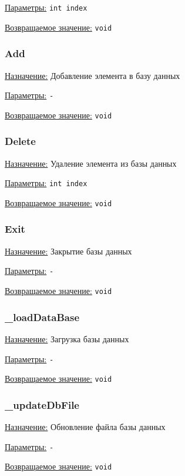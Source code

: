 \underline{Параметры:} \verb|int index|

\underline{Возвращаемое значение:} \verb|void|


\subsubsection{Add}

\underline{Назначение:} Добавление элемента в базу данных

\underline{Параметры:} \verb|-|

\underline{Возвращаемое значение:} \verb|void|


\subsubsection{Delete}

\underline{Назначение:} Удаление элемента из базы данных

\underline{Параметры:} \verb|int index|

\underline{Возвращаемое значение:} \verb|void|


\subsubsection{Exit}

\underline{Назначение:} Закрытие базы данных

\underline{Параметры:} \verb|-|

\underline{Возвращаемое значение:} \verb|void|


\subsubsection{\_loadDataBase}

\underline{Назначение:} Загрузка базы данных

\underline{Параметры:} \verb|-|

\underline{Возвращаемое значение:} \verb|void|


\subsubsection{\_updateDbFile}

\underline{Назначение:} Обновление файла базы данных

\underline{Параметры:} \verb|-|

\underline{Возвращаемое значение:} \verb|void|

